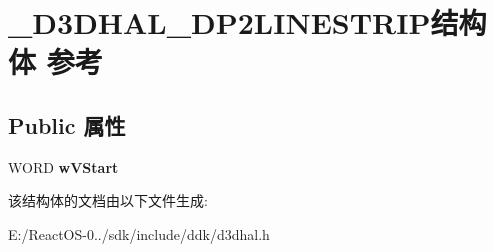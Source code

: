 \hypertarget{struct___d3_d_h_a_l___d_p2_l_i_n_e_s_t_r_i_p}{}\section{\+\_\+\+D3\+D\+H\+A\+L\+\_\+\+D\+P2\+L\+I\+N\+E\+S\+T\+R\+I\+P结构体 参考}
\label{struct___d3_d_h_a_l___d_p2_l_i_n_e_s_t_r_i_p}
\subsection*{Public 属性}
\begin{DoxyCompactItemize}
\item 
\mbox{\label{struct___d3_d_h_a_l___d_p2_l_i_n_e_s_t_r_i_p_a2cc59cd9c0215f4e7d5dfe56430eee10}} 
W\+O\+RD {\bfseries w\+V\+Start}
\end{DoxyCompactItemize}


该结构体的文档由以下文件生成\+:\begin{DoxyCompactItemize}
\item 
E\+:/\+React\+O\+S-\/0../sdk/include/ddk/d3dhal.\+h\end{DoxyCompactItemize}
